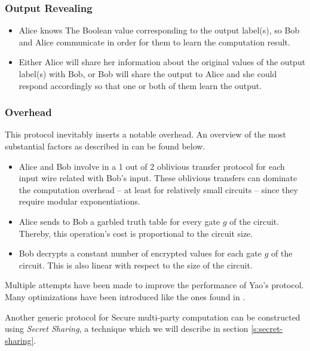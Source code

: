 \subsubsection{Output Revealing}\label{ss:output-revealing}
\begin{itemize}
  \item Alice knows The Boolean value corresponding to the output label(s), so Bob and Alice communicate in order for them to learn the computation result.
  \item Either Alice will share her information about the original values of the output label(s) with Bob, or Bob will share the output to Alice and she could respond accordingly so that one or both of them learn the output.
\end{itemize}

\subsubsection{Overhead}\label{ss:overhead}
This protocol inevitably inserts a notable overhead. An overview of the most substantial factors as described in \cite{lindell2009secure} can be found below.

\begin{itemize}
  \item Alice and Bob involve in a 1 out of 2 oblivious transfer protocol for each input wire related with Bob's input. These oblivious transfers can dominate the computation overhead -- at least for relatively small circuits -- since they require modular exponentiations.
  \item Alice sends to Bob a garbled truth table for every gate $g$ of the circuit. Thereby, this operation's cost is proportional to the circuit size.
  \item Bob decrypts a constant number of encrypted values for each gate $g$ of the circuit. This is also linear with respect to the size of the circuit.
\end{itemize}

Multiple attempts have been made to improve the performance of Yao's protocol. Many optimizations have been introduced like the ones found in \cite{beaver1990round, naor1999privacy, kolesnikov2008improved, bellare2013efficient, zahur2015two}.

Another generic protocol for Secure multi\hyp party computation can be constructed using \textit{Secret Sharing}, a technique which we will describe in section \ref{s:secret-sharing}.
